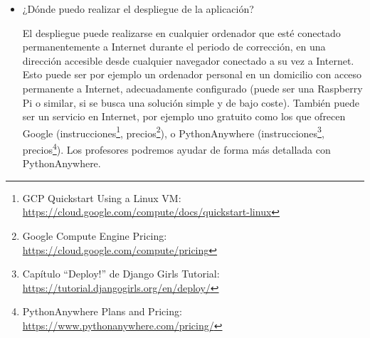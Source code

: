 \begin{itemize}
\item ¿Dónde puedo realizar el despliegue de la aplicación?

  El despliegue puede realizarse en cualquier ordenador que esté conectado permanentemente a Internet durante el periodo de corrección, en una dirección accesible desde cualquier navegador conectado a su vez a Internet. Esto puede ser por ejemplo un ordenador personal en un domicilio con acceso permanente a Internet, adecuadamente configurado (puede ser una Raspberry Pi o similar, si se busca una solución simple y de bajo coste). También puede ser un servicio en Internet, por ejemplo uno gratuito como los que ofrecen Google (instrucciones\footnote{GCP Quickstart Using a Linux VM:\\ \url{https://cloud.google.com/compute/docs/quickstart-linux}}, precios\footnote{Google Compute Engine Pricing:\\ \url{https://cloud.google.com/compute/pricing}}), o PythonAnywhere (instrucciones\footnote{Capítulo ``Deploy!'' de Django Girls Tutorial:\\ \url{https://tutorial.djangogirls.org/en/deploy/}}, precios\footnote{PythonAnywhere Plans and Pricing:\\ \url{https://www.pythonanywhere.com/pricing/}}). Los profesores podremos ayudar de forma más detallada con PythonAnywhere.

\end{itemize}

